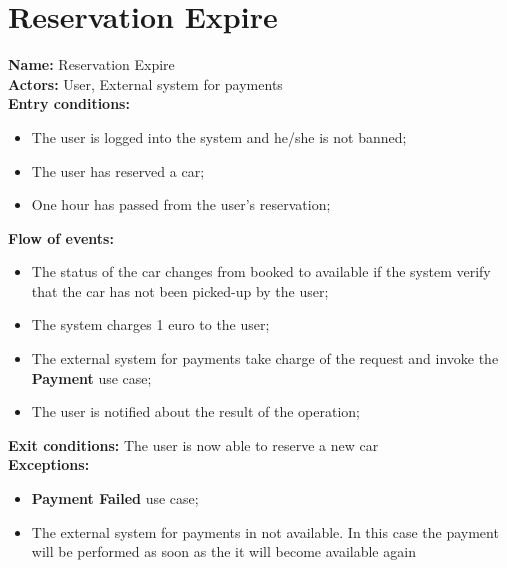 \section*{Reservation Expire}
\textbf{Name:} Reservation Expire\\
\textbf{Actors:} User, External system for payments\\
\textbf{Entry conditions:}
\begin{itemize}
\item The user is logged into the system and he/she is not banned;
\item The user has reserved a car;
\item One hour has passed from the user's reservation;
\end{itemize}
\textbf{Flow of events:}
\begin{itemize}
\item The status of the car changes from booked to available if the system verify that the car has not been picked-up by the user;
\item The system charges 1 euro to the user;
\item The external system for payments take charge of the request and invoke the \textbf{Payment} use case;
\item The user is notified about the result of the operation;
\end{itemize}
\textbf{Exit conditions:} The user is now able to reserve a new car \\
\textbf{Exceptions:}
\begin{itemize}
\item\textbf{Payment Failed} use case;
\item The external system for payments in not available. In this case the payment will be performed as soon as the it will become available again
\end{itemize}


